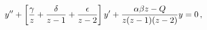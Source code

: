 \begin{equation}
 y'' + \left[ {\gamma\over z} +{\delta\over z-1} + 
{\epsilon\over z-2}\right] y' + {\alpha\beta z - Q\over z(z-1)(z-2)}y = 0\,,
\label{heun_eq}
\end{equation}

